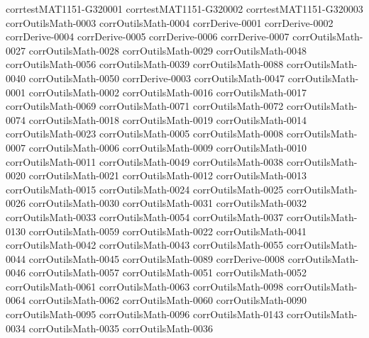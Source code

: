 {corrtestMAT1151-G320001}
{corrtestMAT1151-G320002}
{corrtestMAT1151-G320003}
{corrOutilsMath-0003}
{corrOutilsMath-0004}
{corrDerive-0001}
{corrDerive-0002}
{corrDerive-0004}
{corrDerive-0005}
{corrDerive-0006}
{corrDerive-0007}
{corrOutilsMath-0027}
{corrOutilsMath-0028}
{corrOutilsMath-0029}
{corrOutilsMath-0048}
{corrOutilsMath-0056}
{corrOutilsMath-0039}
{corrOutilsMath-0088}
{corrOutilsMath-0040}
{corrOutilsMath-0050}
{corrDerive-0003}
{corrOutilsMath-0047}
{corrOutilsMath-0001}
{corrOutilsMath-0002}
{corrOutilsMath-0016}
{corrOutilsMath-0017}
{corrOutilsMath-0069}
{corrOutilsMath-0071}
{corrOutilsMath-0072}
{corrOutilsMath-0074}
{corrOutilsMath-0018}
{corrOutilsMath-0019}
{corrOutilsMath-0014}
{corrOutilsMath-0023}
{corrOutilsMath-0005}
{corrOutilsMath-0008}
{corrOutilsMath-0007}
{corrOutilsMath-0006}
{corrOutilsMath-0009}
{corrOutilsMath-0010}
{corrOutilsMath-0011}
{corrOutilsMath-0049}
{corrOutilsMath-0038}
{corrOutilsMath-0020}
{corrOutilsMath-0021}
{corrOutilsMath-0012}
{corrOutilsMath-0013}
{corrOutilsMath-0015}
{corrOutilsMath-0024}
{corrOutilsMath-0025}
{corrOutilsMath-0026}
{corrOutilsMath-0030}
{corrOutilsMath-0031}
{corrOutilsMath-0032}
{corrOutilsMath-0033}
{corrOutilsMath-0054}
{corrOutilsMath-0037}
{corrOutilsMath-0130}
{corrOutilsMath-0059}
{corrOutilsMath-0022}
{corrOutilsMath-0041}
{corrOutilsMath-0042}
{corrOutilsMath-0043}
{corrOutilsMath-0055}
{corrOutilsMath-0044}
{corrOutilsMath-0045}
{corrOutilsMath-0089}
{corrDerive-0008}
{corrOutilsMath-0046}
{corrOutilsMath-0057}
{corrOutilsMath-0051}
{corrOutilsMath-0052}
{corrOutilsMath-0061}
{corrOutilsMath-0063}
{corrOutilsMath-0098}
{corrOutilsMath-0064}
{corrOutilsMath-0062}
{corrOutilsMath-0060}
{corrOutilsMath-0090}
{corrOutilsMath-0095}
{corrOutilsMath-0096}
{corrOutilsMath-0143}
{corrOutilsMath-0034}
{corrOutilsMath-0035}
{corrOutilsMath-0036}
